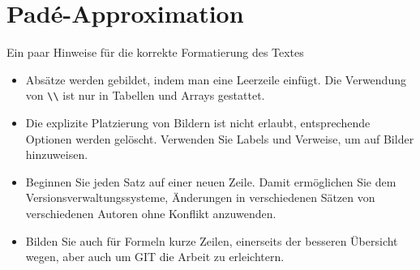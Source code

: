 %
%
%
\chapter{Padé-Approximation\label{chapter:pade}}
\begin{refsection}

Ein paar Hinweise für die korrekte Formatierung des Textes
\begin{itemize}
\item
Absätze werden gebildet, indem man eine Leerzeile einfügt.
Die Verwendung von \verb+\\+ ist nur in Tabellen und Arrays gestattet.
\item
Die explizite Platzierung von Bildern ist nicht erlaubt, entsprechende
Optionen werden gelöscht. 
Verwenden Sie Labels und Verweise, um auf Bilder hinzuweisen.
\item
Beginnen Sie jeden Satz auf einer neuen Zeile. 
Damit ermöglichen Sie dem Versionsverwaltungssysteme, Änderungen
in verschiedenen Sätzen von verschiedenen Autoren ohne Konflikt 
anzuwenden.
\item 
Bilden Sie auch für Formeln kurze Zeilen, einerseits der besseren
Übersicht wegen, aber auch um GIT die Arbeit zu erleichtern.
\end{itemize}






\printbibliography[heading=subbibliography]
\end{refsection}
